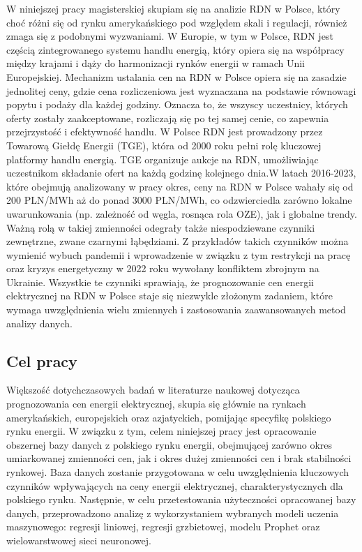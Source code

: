 W niniejszej pracy magisterskiej skupiam się na analizie RDN w Polsce, który choć różni się od rynku amerykańskiego pod względem skali i regulacji, również zmaga się z podobnymi wyzwaniami. W Europie, w tym w Polsce, RDN jest częścią zintegrowanego systemu handlu energią, który opiera się na współpracy między krajami i dąży do harmonizacji rynków energii w ramach Unii Europejskiej. Mechanizm ustalania cen na RDN w Polsce opiera się na zasadzie jednolitej ceny, gdzie cena rozliczeniowa jest wyznaczana na podstawie równowagi popytu i podaży dla każdej godziny. Oznacza to, że wszyscy uczestnicy, których oferty zostały zaakceptowane, rozliczają się po tej samej cenie, co zapewnia przejrzystość i efektywność handlu. W Polsce RDN jest prowadzony przez Towarową Giełdę Energii (TGE), która od 2000 roku pełni rolę kluczowej platformy handlu energią. TGE organizuje aukcje na RDN, umożliwiając uczestnikom składanie ofert na każdą godzinę kolejnego dnia.W latach 2016-2023, które obejmują analizowany w pracy okres, ceny na RDN w Polsce wahały się od 200 PLN/MWh aż do ponad 3000 PLN/MWh, co odzwierciedla zarówno lokalne uwarunkowania (np. zależność od węgla, rosnąca rola OZE), jak i globalne trendy. Ważną rolą w takiej zmienności odegrały także niespodziewane czynniki zewnętrzne, zwane czarnymi łąbędziami. Z przykładów takich czynników można wymienić wybuch pandemii i wprowadzenie w związku z tym restrykcji na pracę oraz kryzys energetyczny w 2022 roku wywołany konfliktem zbrojnym na Ukrainie. Wszystkie te czynniki sprawiają, że prognozowanie cen energii elektrycznej na RDN w Polsce staje się niezwykle złożonym zadaniem, które wymaga uwzględnienia wielu zmiennych i zastosowania zaawansowanych metod analizy danych.

\subsection*{Cel pracy}
\label{ch:cel_pracy}

Większość dotychczasowych badań w literaturze naukowej dotycząca prognozowania cen energii elektrycznej, skupia się głównie na rynkach amerykańskich, europejskich oraz azjatyckich, pomijając specyfikę polskiego rynku energii. W związku z tym, celem niniejszej pracy jest opracowanie obszernej bazy danych z polskiego rynku energii, obejmującej zarówno okres umiarkowanej zmienności cen, jak i okres dużej zmienności cen i brak stabilności rynkowej. Baza danych zostanie przygotowana w celu uwzględnienia kluczowych czynników wpływających na ceny energii elektrycznej, charakterystycznych dla polskiego rynku. Następnie, w celu przetestowania użyteczności opracowanej bazy danych, przeprowadzono analizę z wykorzystaniem wybranych modeli uczenia maszynowego: regresji liniowej, regresji grzbietowej, modelu Prophet oraz wielowarstwowej sieci neuronowej.